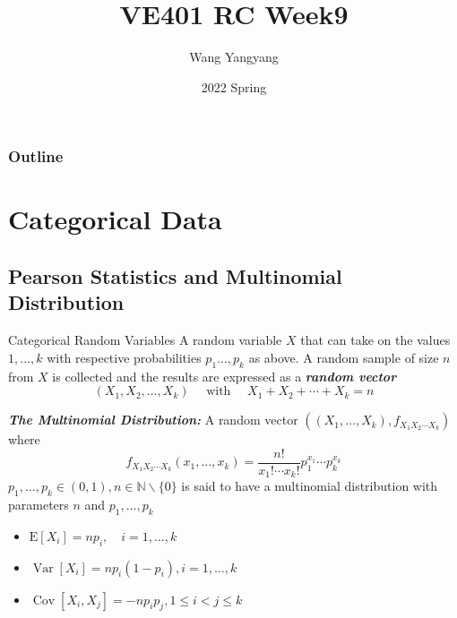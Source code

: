 \documentclass{beamer}
\title{VE401 RC Week9}
\author{Wang Yangyang}
\date{2022 Spring}
\institute{UM-SJTU JI}
\newcommand{\bb}[1]{\textcolor{antiquefuchsia}{\textbf{\textit{#1}}}}
\begin{document}
\maketitle

\begin{frame}
\frametitle{Outline}
\tableofcontents
\end{frame}



\section{Categorical Data}
\subsection{Pearson Statistics and Multinomial Distribution}
\begin{frame}{Categorical Random Variables}
A random variable $X$ that can take on the values $1, \ldots, k$ with respective probabilities $p_{1} \ldots, p_{k}$ as above. A random sample of size $n$ from $X$ is collected and the results are expressed as a \bb{random vector}
$$
\left(X_{1}, X_{2}, \ldots, X_{k}\right) \quad \text { with } \quad X_{1}+X_{2}+\cdots+X_{k}=n
$$

\bb{The Multinomial Distribution:} A random vector $\left(\left(X_{1}, \ldots, X_{k}\right), f_{X_{1} X_{2} \cdots X_{k}}\right)$ where
$$
f_{X_{1} X_{2} \cdots X_{k}}\left(x_{1}, \ldots, x_{k}\right)=\frac{n !}{x_{1} ! \cdots x_{k} !} p_{1}^{x_{1}} \cdots p_{k}^{x_{k}}
$$
$p_{1}, \ldots, p_{k} \in(0,1), n \in \mathbb{N} \backslash\{0\}$ is said to have a multinomial distribution with parameters $n$ and $p_{1}, \ldots, p_{k}$
\begin{itemize}
\item
$
\mathrm{E}\left[X_{i}\right]=n p_{i}, \quad i=1, \ldots, k
$
\item $\operatorname{Var}\left[X_{i}\right]=n p_{i}\left(1-p_{i}\right), i=1, \ldots, k$
\item $\operatorname{Cov}\left[X_{i}, X_{j}\right]=-n p_{i} p_{j}, 1 \leq i<j \leq k$
\end{itemize}
\end{frame}
\end{document}
